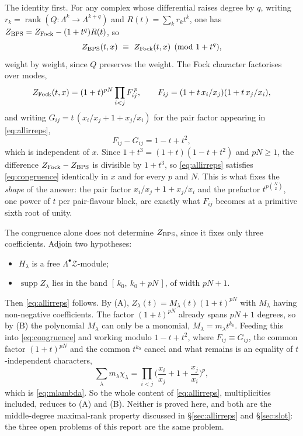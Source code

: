 \documentclass[10pt]{article}
\begin{document}
The identity first. For any complex whose differential raises degree by $q$, writing
$r_k=\operatorname{rank}(Q:\Lambda^k\to\Lambda^{k+q})$ and $R(t)=\sum_kr_kt^k$, one has
$Z_{\rm BPS}=Z_{\rm Fock}-(1+t^q)R(t)$, so
\begin{equation}
Z_{\rm BPS}(t,x)\ \equiv\ Z_{\rm Fock}(t,x) \pmod{1+t^{q}},
\label{eq:congruence}
\end{equation}
weight by weight, since $Q$ preserves the weight. The Fock character factorises over modes,
\begin{equation}
Z_{\rm Fock}(t,x)=(1+t)^{pN}\prod_{i<j}F_{ij}^{\,p},\qquad F_{ij}=(1+t\,x_i/x_j)(1+t\,x_j/x_i),
\end{equation}
and writing $G_{ij}=t\,(x_i/x_j+1+x_j/x_i)$ for the pair factor appearing in \eqref{eq:allirreps},
\begin{equation}
F_{ij}-G_{ij}=1-t+t^{2},
\end{equation}
which is independent of $x$. Since $1+t^3=(1+t)(1-t+t^2)$ and $pN\ge1$, the difference
$Z_{\rm Fock}-Z_{\rm BPS}$ is divisible by $1+t^3$, so \eqref{eq:allirreps} satisfies \eqref{eq:congruence}
identically in $x$ and for every $p$ and $N$. This is what fixes the \emph{shape} of the answer: the pair factor
$x_i/x_j+1+x_j/x_i$ and the prefactor $t^{p\binom N2}$, one power of $t$ per pair-flavour block, are exactly
what $F_{ij}$ becomes at a primitive sixth root of unity.

The congruence alone does not determine $Z_{\rm BPS}$, since it fixes only three coefficients. Adjoin two
hypotheses:
\begin{itemize}
\item[(A)] $H_\lambda$ is a free $\Lambda^\bullet\mathcal Z$-module;
\item[(B)] $\operatorname{supp}Z_\lambda$ lies in the band $[\,k_0,\ k_0+pN\,]$, of width $pN+1$.
\end{itemize}
Then \eqref{eq:allirreps} follows. By (A), $Z_\lambda(t)=M_\lambda(t)(1+t)^{pN}$ with $M_\lambda$ having
non-negative coefficients. The factor $(1+t)^{pN}$ already spans $pN+1$ degrees, so by (B) the polynomial
$M_\lambda$ can only be a monomial, $M_\lambda=m_\lambda t^{k_0}$. Feeding this into \eqref{eq:congruence} and
working modulo $1-t+t^2$, where $F_{ij}\equiv G_{ij}$, the common factor $(1+t)^{pN}$ and the common $t^{k_0}$
cancel and what remains is an equality of $t$-independent characters,
\begin{equation}
\sum_\lambda m_\lambda\chi_\lambda=\prod_{i<j}\Big(\frac{x_i}{x_j}+1+\frac{x_j}{x_i}\Big)^{p},
\end{equation}
which is \eqref{eq:mlambda}. So the whole content of \eqref{eq:allirreps}, multiplicities included, reduces to
(A) and (B). Neither is proved here, and both are the middle-degree maximal-rank property discussed in
\S\ref{sec:allirreps} and \S\ref{sec:slot}: the three open problems of this report are the same problem.
\end{document}
